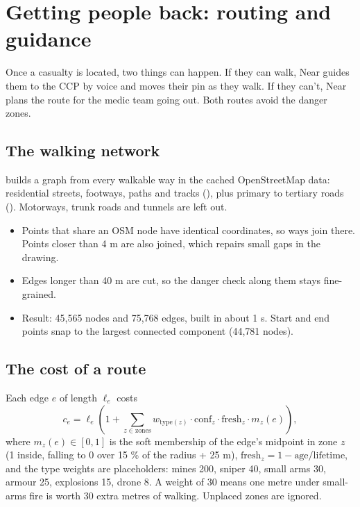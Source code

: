 \chapter{Getting people back: routing and guidance}\label{ch:routing}

Once a casualty is located, two things can happen. If they can walk, Near guides them to the CCP by voice
and moves their pin as they walk. If they can't, Near plans the route for the medic team going out. Both
routes avoid the danger zones.

\section{The walking network}

 builds a graph from every walkable way in the cached OpenStreetMap data: residential streets,
footways, paths and tracks (), plus primary to tertiary roads ().
Motorways, trunk roads and tunnels are left out.
\begin{itemize}
  \item Points that share an OSM node have identical coordinates, so ways join there. Points closer than 4 m are
        also joined, which repairs small gaps in the drawing.
  \item Edges longer than 40 m are cut, so the danger check along them stays fine-grained.
  \item Result: 45,565 nodes and 75,768 edges, built in about 1 s. Start and end points snap to the largest
        connected component (44,781 nodes).
\end{itemize}

\section{The cost of a route}

Each edge $e$ of length $\ell_e$ costs
\begin{equation}
  c_e = \ell_e \left(1 + \sum_{z \in \text{zones}} w_{\text{type}(z)} \cdot \text{conf}_z \cdot
  \text{fresh}_z \cdot m_z(e)\right),
\end{equation}
where $m_z(e) \in [0,1]$ is the soft membership of the edge's midpoint in zone $z$ (1 inside, falling to 0 over
15 \% of the radius + 25 m), $\text{fresh}_z = 1 - \text{age}/\text{lifetime}$, and the type weights are
placeholders: mines 200, sniper 40, small arms 30, armour 25, explosions 15, drone 8. A weight of 30 means one
metre under small-arms fire is worth 30 extra metres of walking. Unplaced zones are ignored.

